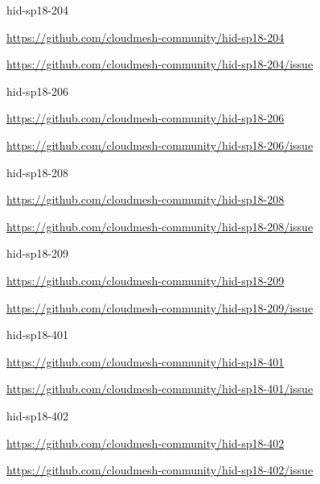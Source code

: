 \begin{IU}

hid-sp18-204

\url{https://github.com/cloudmesh-community/hid-sp18-204}

\url{https://github.com/cloudmesh-community/hid-sp18-204/issue}

\end{IU}


\begin{IU}

hid-sp18-206

\url{https://github.com/cloudmesh-community/hid-sp18-206}

\url{https://github.com/cloudmesh-community/hid-sp18-206/issue}

\end{IU}


\begin{IU}

hid-sp18-208

\url{https://github.com/cloudmesh-community/hid-sp18-208}

\url{https://github.com/cloudmesh-community/hid-sp18-208/issue}

\end{IU}


\begin{IU}

hid-sp18-209

\url{https://github.com/cloudmesh-community/hid-sp18-209}

\url{https://github.com/cloudmesh-community/hid-sp18-209/issue}

\end{IU}


\begin{IU}

hid-sp18-401

\url{https://github.com/cloudmesh-community/hid-sp18-401}

\url{https://github.com/cloudmesh-community/hid-sp18-401/issue}

\end{IU}


\begin{IU}

hid-sp18-402

\url{https://github.com/cloudmesh-community/hid-sp18-402}

\url{https://github.com/cloudmesh-community/hid-sp18-402/issue}

\end{IU}


